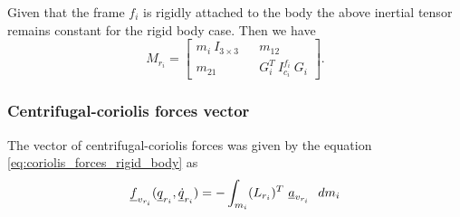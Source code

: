 Given that the frame $f_i$ is rigidly attached to the body the above inertial 
tensor remains constant for the rigid body case. Then we have 
\begin{equation}
    M_{r_i} = \begin{bmatrix}
        m_{i}\ I_{3 \times 3} && m_{12} \\ m_{21} && G^{T}_{i} \ I^{f_i}_{c_i}\ G_i
    \end{bmatrix}.
    \label{eq:mass_matrix_rigid_body}
\end{equation}



\subsubsection{Centrifugal-coriolis forces vector}
The vector of centrifugal-coriolis forces was given by the equation 
\eqref{eq:coriolis_forces_rigid_body} as
\[
    \vecd{f}_{v_{r_i}}(\vecd{q}_{r_{i}}, 
    \vecd{\dot{q}}_{r_{i}}) = - \int_{m_i} (L_{r_i})^{T} \ \vecd{a}_{v_{r_i}}\ 
    \ dm_{i}
\]




